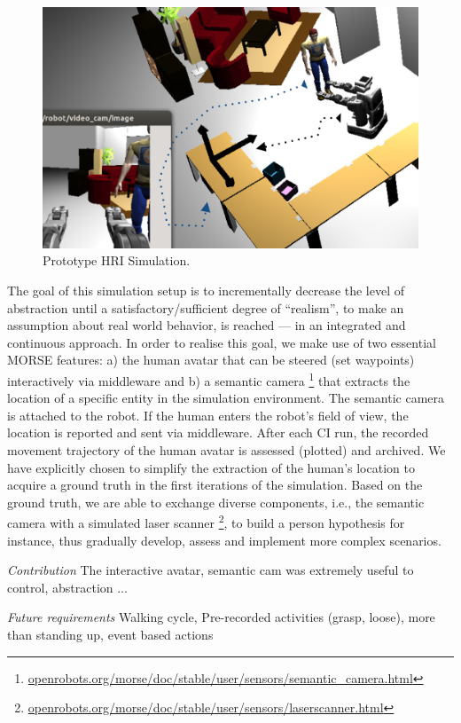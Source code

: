 \documentclass[conference]{IEEEtran}
\begin{document}
\begin{figure}[H]
      \centering
      \includegraphics[width=0.9\linewidth]{proto-setup.png}
      \caption{Prototype HRI Simulation.}
      \label{fig|proto}
\end{figure}

The goal of this simulation setup is to incrementally decrease the level of
abstraction until a satisfactory/sufficient degree of ``realism'', to make an
assumption about real world behavior, is reached --- in an integrated and
continuous approach. In order to realise this goal, we make use of two essential
MORSE features: a) the human avatar that can be steered (set waypoints)
interactively via middleware and b) a semantic camera
\footnote{\url{openrobots.org/morse/doc/stable/user/sensors/semantic_camera.html}}
that extracts the location of a specific entity in the simulation environment.
The semantic camera is attached to the robot. If the human enters the robot's
field of view, the location is reported and sent via middleware. After each CI
run, the recorded movement trajectory of the human avatar is assessed (plotted)
and archived. We have explicitly chosen to simplify the extraction of the
human's location to acquire a ground truth in the first iterations of the
simulation. Based on the ground truth, we are able to exchange diverse
components, i.e., the semantic camera with a simulated laser scanner
\footnote{\url{openrobots.org/morse/doc/stable/user/sensors/laserscanner.html}},
to build a person hypothesis for instance, thus gradually develop, assess and
implement more complex scenarios. 

\emph{Contribution} The interactive avatar, semantic cam was extremely useful to
control, abstraction ...

\emph{Future requirements} Walking cycle, Pre-recorded activities (grasp,
loose), more than standing up, event based actions
\end{document}
